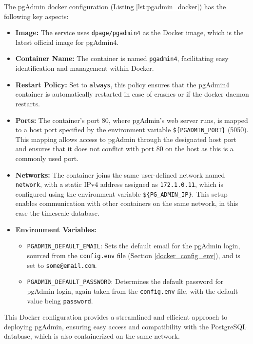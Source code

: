 The pgAdmin docker configuration (Listing \ref{lst:pgadmin_docker}) has the following key aspects: 

\begin{itemize}
  \item \textbf{Image:} The service uses \texttt{dpage/pgadmin4} as the Docker image, which is the latest official image for pgAdmin4.
  \item \textbf{Container Name:} The container is named \texttt{pgadmin4}, facilitating easy identification and management within Docker.
  \item \textbf{Restart Policy:} Set to \texttt{always}, this policy ensures that the pgAdmin4 container is automatically restarted in case of crashes or if the docker daemon restarts.
  \item \textbf{Ports:} The container's port 80, where pgAdmin's web server runs, is mapped to a host port specified by the environment variable \texttt{\$\{PGADMIN\_PORT\}} (5050). This mapping allows access to pgAdmin through the designated host port and ensures that it does not conflict with port 80 on the host as this is a commonly used port. 
  \item \textbf{Networks:} The container joins the same user-defined network named \texttt{network}, with a static IPv4 address assigned as \texttt{172.1.0.11}, which is configured using the environment variable \texttt{\$\{PG\_ADMIN\_IP\}}. This setup enables communication with other containers on the same network, in this case the timescale database.

  \item \textbf{Environment Variables:}
    \begin{itemize}
      \item \texttt{PGADMIN\_DEFAULT\_EMAIL}: Sets the default email for the pgAdmin login, sourced from the \texttt{config.env} file (Section \ref{docker_config_env}), and is set to \texttt{some@email.com}.
      \item \texttt{PGADMIN\_DEFAULT\_PASSWORD}: Determines the default password for pgAdmin login, again taken from the \texttt{config.env} file, with the default value being \texttt{password}.
    \end{itemize}
\end{itemize}

This Docker configuration provides a streamlined and efficient approach to deploying pgAdmin, ensuring easy access and compatibility with the PostgreSQL database, which is also containerized on the same network. 


